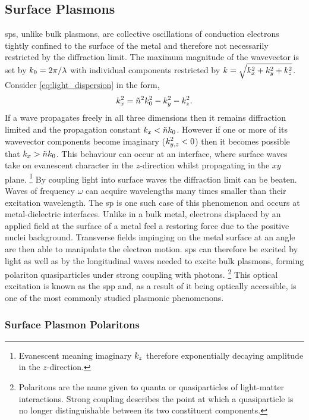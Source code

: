 \documentclass{article}
\begin{document}
\subsection{Surface Plasmons}

\Glspl{sp}, unlike bulk plasmons, are collective oscillations of conduction electrons tightly confined to the surface of the metal and therefore not necessarily restricted by the diffraction limit. The maximum magnitude of the wavevector is set by $k_0=2\pi/\lambda$ with individual components restricted by $k = \sqrt{k_x^2 + k_y^2 + k_z^2}$. Consider \eqref{eq:light_dispersion} in the form,
\begin{equation}
	k_x^2 = \tilde{n}^2 k_0^2 - k_y^2 - k_z^2.
\end{equation}
If a wave propagates freely in all three dimensions then it remains diffraction limited and the propagation constant $k_x < \tilde{n}k_0$. However if one or more of its wavevector components become imaginary ($k_{y,z}^2 < 0$) then it becomes possible that $k_x > \tilde{n}k_0$. This behaviour can occur at an interface, where surface waves take on evanescent character in the $z$-direction whilst propagating in the $xy$ plane.%
\footnote{Evanescent meaning imaginary $k_z$ therefore exponentially decaying amplitude in the $z$-direction.}
By coupling light into surface waves the diffraction limit can be beaten. Waves of frequency $\omega$ can acquire wavelengths many times smaller than their excitation wavelength. The \gls{sp} is one such case of this phenomenon and occurs at metal-dielectric interfaces. %
Unlike in a bulk metal, electrons displaced by an applied field at the surface of a metal feel a restoring force due to the positive nuclei background. Transverse fields impinging on the metal surface at an angle are then able to manipulate the electron motion. \Glspl{sp} can therefore be excited by light as well as by the longitudinal waves needed to excite bulk plasmons, forming polariton quasiparticles under strong coupling with photons.%
\footnote{Polaritons are the name given to quanta or quasiparticles of light-matter interactions. Strong coupling describes the point at which a quasiparticle is no longer distinguishable between its two constituent components.}
This optical excitation is known as the \gls{spp} and, as a result of it being optically accessible, is one of the most commonly studied plasmonic phenomenons.

\subsubsection{Surface Plasmon Polaritons}
\end{document}
